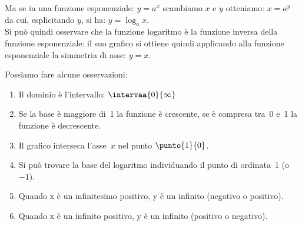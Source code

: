 \begin{minipage}{.35\textwidth}
\begin{center}
\begin{inaccessibleblock}[Grafico di una funzione esponenziale e 
il suo simmetrico rispetto a y=x]
  \graficologaritmica
\end{inaccessibleblock}
\end{center}
\end{minipage} \qquad
\begin{minipage}{.6\textwidth}
Ma se in una funzione esponenziale: \(y=a^x\) scambiamo $x$ e $y$ 
otteniamo: \(x=a^y\) da cui, esplicitando $y$, si ha: \(y=\log_a x\).\\[7pt] Si può quindi 
osservare che la funzione logaritmo è la funzione inversa della funzione 
esponenziale: il suo grafico si ottiene quindi applicando alla funzione 
esponenziale la simmetria di asse: \(y=x\).
\end{minipage}

\begin{minipage}{.52\textwidth}
 Possiamo fare alcune osservazioni:
\begin{enumerate}
 \item Il dominio è l'intervallo: \(\intervaa{0}{\infty}\)
 \item Se la base è maggiore di~1 la funzione è crescente, 
 se è compresa tra~0 e~1 la funzione è decrescente.
 \item Il grafico interseca l'asse~\(x\) nel punto $\punto{1}{0}$.
 \item Si può trovare la base del logaritmo individuando il punto di 
 ordinata~1 (o~\(-1\)).
 \item Quando x è un infinitesimo positivo, y è un infinito (negativo o 
positivo).
 \item Quando x è un infinito positivo, y è un infinito (positivo o negativo).
\end{enumerate}
\end{minipage} \qquad 
\begin{minipage}{.45\textwidth}
 \begin{inaccessibleblock}
  \logdiversebasi
\end{inaccessibleblock}
\end{minipage}


